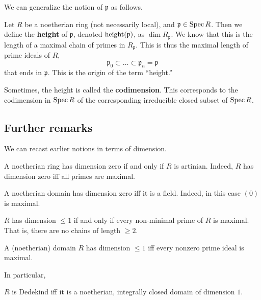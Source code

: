 We can generalize the notion of $\mathfrak{p}$ as follows.
\begin{definition} 
Let $R$ be a noetherian ring (not necessarily local), and $\mathfrak{p} \in
\operatorname{Spec} R$. Then we define the \textbf{height} of $\mathfrak{p}$, denoted
$\operatorname{height}(\mathfrak{p})$, as $\dim R_{\mathfrak{p}}$.
We know that this is the length of a maximal chain of primes in
$R_{\mathfrak{p}}$. This is thus the maximal length of prime ideals of $R$, 
\[ \mathfrak{p}_0 \subset \dots \subset \mathfrak{p}_n = \mathfrak{p}  \]
that ends in $\mathfrak{p}$. This is the origin of the term ``height.''
\end{definition} 

\begin{remark} 
Sometimes, the height is called the \textbf{codimension}. This corresponds to
the codimension in $\operatorname{Spec} R$ of the corresponding irreducible closed subset of
$\operatorname{Spec} R$.
\end{remark} 

\subsection{Further remarks}

We can recast earlier notions in terms of dimension.
\begin{remark} 
A noetherian ring has dimension zero if and only if $R$ is artinian. Indeed,
$R$ has dimension zero iff all primes are maximal.
\end{remark} 


\begin{remark} 
A noetherian domain has dimension zero iff it is a field. Indeed, in this case
$(0)$ is maximal.
\end{remark} 

\begin{remark} 
$R$ has dimension $\leq 1$ if and only if every non-minimal prime of $R$ is
maximal. That is, there are no chains of length $\geq 2$.
\end{remark} 

\begin{remark} 
A (noetherian) domain  $R$ has dimension $\leq 1$ iff every nonzero prime ideal
is maximal.
\end{remark} 

In particular,
\begin{proposition} 
$R$ is Dedekind iff it is a noetherian, integrally closed domain of dimension
$1$. 
\end{proposition} 


